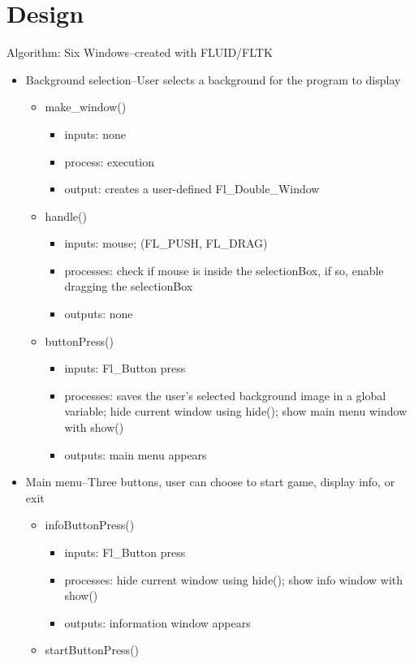 \documentclass{article}
\begin{document}
\section*{Design} Algorithm:
Six Windows--created with FLUID/FLTK
\begin{itemize}
\item Background selection--User selects a background for the program to display
\begin{itemize}
\item make\_window()
\begin{itemize}
\item inputs: none
\item process: execution
\item output: creates a user-defined Fl\_Double\_Window
\end{itemize}
\item handle()
\begin{itemize}
\item inputs: mouse; (FL\_PUSH, FL\_DRAG)
\item processes: check if mouse is inside the selectionBox, if so, enable dragging the selectionBox
\item outputs: none
\end{itemize}
\item buttonPress()
\begin{itemize}
\item inputs: Fl\_Button press
\item processes: saves the user's selected background image in a global variable; hide current window using hide(); show main menu window with show()
\item outputs: main menu appears
\end{itemize}
\end{itemize}
\item Main menu--Three buttons, user can choose to start game, display info, or exit
\begin{itemize}
\item infoButtonPress()
\begin{itemize}
\item inputs: Fl\_Button press
\item processes: hide current window using hide(); show info window with show()
\item outputs: information window appears
\end{itemize}
\item startButtonPress()
\begin{itemize}

\end{itemize}
\end{itemize}
\end{itemize}
\end{document}
